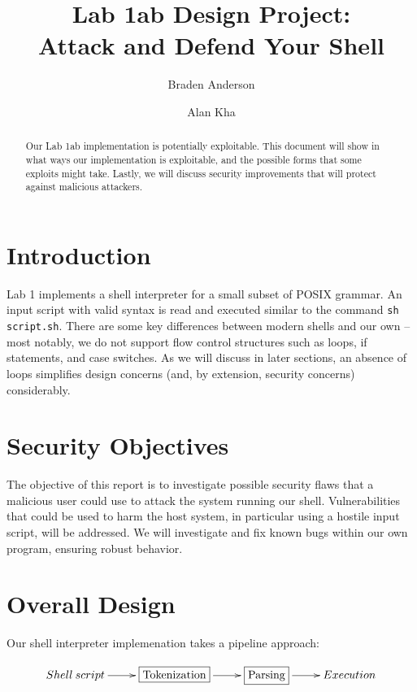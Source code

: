 \documentclass[12pt]{article}
\begin{document}
\lstset{language=C}

\title{Lab 1ab Design Project:\\ Attack and Defend Your Shell}
\author[1]{Braden Anderson}
\author[2]{Alan Kha}

\maketitle

\begin{abstract}
Our Lab 1ab implementation is potentially exploitable. This document will show in what ways our implementation is exploitable, and the possible forms that some exploits might take. Lastly, we will discuss security improvements that will protect against malicious attackers.
\end{abstract}

\section{Introduction}
Lab 1 implements a shell interpreter for a small subset of POSIX grammar. An input script with valid syntax is read and executed similar to the command \texttt{sh script.sh}. There are some key differences between modern shells and our own -- most notably, we do not support flow control structures such as loops, if statements, and case switches. As we will discuss in later sections, an absence of loops simplifies design concerns (and, by extension, security concerns) considerably.

\section{Security Objectives}
The objective of this report is to investigate possible security flaws that a malicious user could use to attack the system running our shell. Vulnerabilities that could be used to harm the host system, in particular using a hostile input script, will be addressed. We will investigate and fix known bugs within our own program, ensuring robust behavior.


\section{Overall Design}
Our shell interpreter implemenation takes a pipeline approach:

\begin{displaymath}
\xymatrix{
Shell \: script \ar[r] & \framebox{Tokenization} \ar[r] & \framebox{Parsing} \ar[r] & Execution
}
\end{displaymath}
\end{document}
